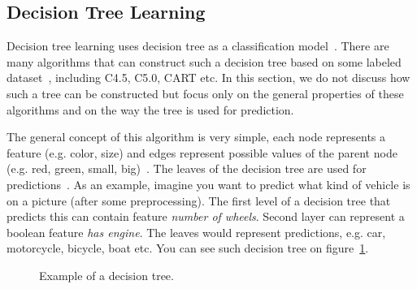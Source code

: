 \subsection{Decision Tree Learning}

Decision tree learning uses decision tree as a classification model~\cite{mitchell1997machine}. There are many algorithms that can construct such a decision tree based on some labeled dataset~\cite{mitchell1997machine}, including C4.5, C5.0, CART etc. In this section, we do not discuss how such a tree can be constructed but focus only on the general properties of these algorithms and on the way the tree is used for prediction.

The general concept of this algorithm is very simple, each node represents a feature (e.g. color, size) and edges represent possible values of the parent node (e.g. red, green, small, big)~\cite{mitchell1997machine}. The leaves of the decision tree are used for predictions~\cite{mitchell1997machine}. As an example, imagine you want to predict what kind of vehicle is on a picture (after some preprocessing). The first level of a decision tree that predicts this can contain feature \textit{number of wheels}. Second layer can represent a boolean feature \textit{has engine}. The leaves would represent predictions, e.g. car, motorcycle, bicycle, boat etc. You can see such decision tree on figure~\ref{fig:decision.tree.example}.

\begin{figure}[htbp]
    \centering
    \caption{Example of a decision tree.}
    \label{fig:decision.tree.example}
\end{figure}

